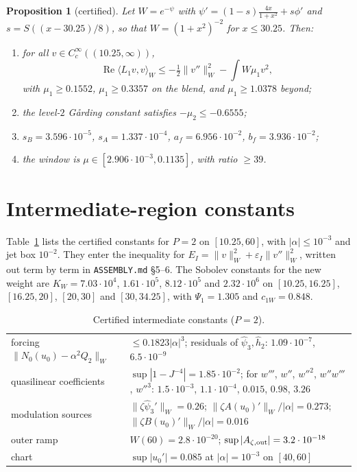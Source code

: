 \documentclass[11pt]{amsart}
\newtheorem{proposition}[theorem]{Proposition}
\theoremstyle{remark}
\newcommand{\eps}{\varepsilon}
\newcommand{\ip}[2]{\langle #1,#2\rangle}
\begin{document}
\begin{proposition}[certified]
Let $W=e^{-\psi}$ with $\psi'=(1-s)\frac{4x}{1+x^2}+s\phi'$ and $s=S((x-30.25)/8)$, so that $W=(1+x^2)^{-2}$ for $x\le30.25$. Then:
\begin{enumerate}
\item for all $v\in C_c^\infty((10.25,\infty))$,
\[
\operatorname{Re}\ip{L_1v}{v}_W\le-\tfrac12\|v''\|_W^2-\int W\mu_1v^2,
\]
with $\mu_1\ge0.1552$, $\mu_1\ge0.3357$ on the blend, and $\mu_1\ge1.0378$ beyond;
\item the level-$2$ G\aa rding constant satisfies $-\mu_2\le-0.6555$;
\item $s_B=3.596\cdot10^{-5}$, $s_A=1.337\cdot10^{-4}$, $a_f=6.956\cdot10^{-2}$, $b_f=3.936\cdot10^{-2}$;
\item the window is $\mu\in[2.906\cdot10^{-3},0.1135]$, with ratio $\ge39$.
\end{enumerate}
\end{proposition}

\section{Intermediate-region constants}
Table~\ref{t:int} lists the certified constants for $P=2$ on $[10.25,60]$, with $|\alpha|\le10^{-3}$ and jet box $10^{-2}$. They enter the inequality for $E_I=\|v\|_W^2+\eps_I\|v''\|_W^2$, written out term by term in \texttt{ASSEMBLY.md} \S5--6. The Sobolev constants for the new weight are $K_W=7.03\cdot10^4$, $1.61\cdot10^5$, $8.12\cdot10^5$ and $2.32\cdot10^6$ on $[10.25,16.25]$, $[16.25,20]$, $[20,30]$ and $[30,34.25]$, with $\Psi_1=1.305$ and $c_{1W}=0.848$.
\begin{table}[h]\small
\begin{tabular}{p{}p{}}
\toprule
forcing $\|N_0(u_0)-\alpha^2Q_2\|_W$ & $\le0.1823|\alpha|^3$; residuals of $\hat\psi_3,\hat h_2$: $1.09\cdot10^{-7}$, $6.5\cdot10^{-9}$\\
quasilinear coefficients & $\sup|1-J^{-4}|=1.85\cdot10^{-2}$; for $w'''$, $w''$, $w''^2$, $w''w'''$, $w''^3$: $1.5\cdot10^{-3}$, $1.1\cdot10^{-4}$, $0.015$, $0.98$, $3.26$\\
modulation sources & $\|\zeta\hat\psi_3'\|_W=0.26$; $\|\zeta A(u_0)'\|_W/|\alpha|=0.273$; $\|\zeta B(u_0)'\|_W/|\alpha|=0.016$\\
outer ramp & $W(60)=2.8\cdot10^{-20}$; $\sup|A_{\zeta,\rm out}|=3.2\cdot10^{-18}$\\
chart & $\sup|u_0'|=0.085$ at $|\alpha|=10^{-3}$ on $[40,60]$\\
\bottomrule
\end{tabular}
\caption{Certified intermediate constants ($P=2$).}\label{t:int}
\end{table}
\end{document}
